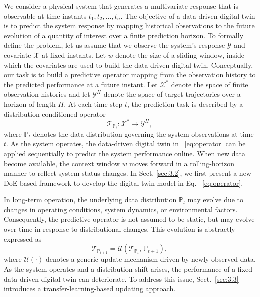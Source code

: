 \documentclass[a4paper,10pt]{cas-sc}%
\begin{document}
We consider a physical system that generates a multivariate response that is observable at time instants $t_1, t_2,...,t_n$. The objective of a data-driven digital twin is to predict the system response by mapping historical observations to the future evolution of a quantity of interest over a finite prediction horizon.
To formally define the problem, let us assume that we observe the system's response $\mathcal{Y}$ and covariate $\mathcal{X}$ at fixed instants. Let $w$ denote the size of a sliding window, inside which the covariates are used to build the data-driven digital twin. Conceptually, our task is to build a predictive operator mapping from the observation history to the predicted performance at a future instant. Let $\mathcal{X}^{\ast}$ denote the space of finite observation histories and let $\mathcal{Y}^H$ denote the space of target trajectories over a horizon of length $H$. At each time step $t$, the prediction task is described by a distribution-conditioned operator
\begin{equation}
	\label{eq:operator}
	\mathcal{T}_{\mathbb{P}_t} : \mathcal{X}^{\ast} \rightarrow \mathcal{Y}^H,
\end{equation}
where $\mathbb{P}_t$ denotes the data distribution governing the system observations at time $t$. As the system operates, the data-driven digital twin in ~\eqref{eq:operator} can be applied sequentially to predict the system performance online. When new data become available, the context window $w$ moves forward in a rolling-horizon manner to reflect system status changes. In Sect. \ref{sec:3.2}, we first present a new DoE-based framework to develop the digital twin model in Eq. ~\eqref{eq:operator}.

In long-term operation, the underlying data distribution $\mathbb{P}_t$ may evolve due to changes in operating conditions, system dynamics, or environmental factors. Consequently, the predictive operator is not assumed to be static, but may evolve over time in response to distributional changes. This evolution is abstractly expressed as
\begin{equation}
	\label{eq:evolution}
	\mathcal{T}_{\mathbb{P}_{t+1}}
	=
	\mathcal{U}\!\left(\mathcal{T}_{\mathbb{P}_t},\, \mathbb{P}_{t+1}\right),
\end{equation}
where $\mathcal{U}(\cdot)$ denotes a generic update mechanism driven by newly observed data. As the system operates and a distribution shift arises, the performance of a fixed data-driven digital twin can deteriorate. To address this issue, Sect.~\ref{sec:3.3} introduces a transfer-learning-based updating approach.
\end{document}
